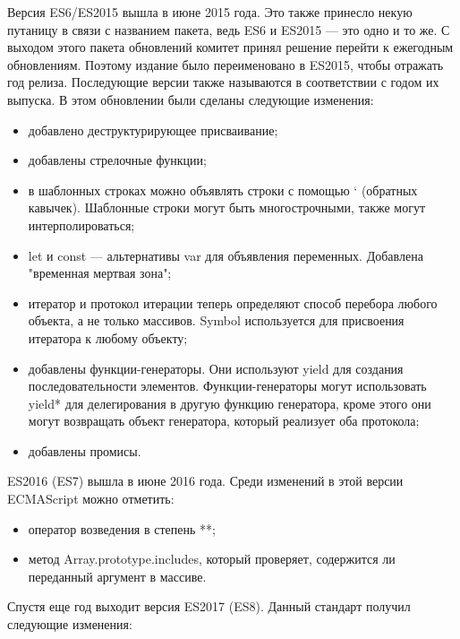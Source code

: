 Версия ES6/ES2015 вышла в июне 2015 года. Это также принесло некую путаницу в связи с названием пакета, ведь ES6 и ES2015 — это одно и то же. С выходом этого пакета обновлений комитет принял решение перейти к ежегодным обновлениям. Поэтому издание было переименовано в ES2015, чтобы отражать год релиза. Последующие версии также называются в соответствии с годом их выпуска. В этом обновлении были сделаны следующие изменения:

\begin{itemize}
    \item добавлено деструктурирующее присваивание;
    \item добавлены стрелочные функции;
    \item в шаблонных строках можно объявлять строки с помощью ` (обратных кавычек). Шаблонные строки могут быть многострочными, также могут интерполироваться;
    \item let и const — альтернативы var для объявления переменных. Добавлена "временная мертвая зона";
    \item итератор и протокол итерации теперь определяют способ перебора любого объекта, а не только массивов. Symbol используется для присвоения итератора к любому объекту;
    \item добавлены функции-генераторы. Они используют yield для создания последовательности элементов. Функции-генераторы могут использовать yield* для делегирования в другую функцию генератора, кроме этого они могут возвращать объект генератора, который реализует оба протокола;
    \item добавлены промисы.
\end{itemize}

ES2016 (ES7) вышла в июне 2016 года. Среди изменений в этой версии ECMAScript можно отметить:

\begin{itemize}
    \item оператор возведения в степень **;
    \item метод Array.prototype.includes, который проверяет, содержится ли переданный аргумент в массиве.
\end{itemize}

Спустя еще год выходит версия ES2017 (ES8). Данный стандарт получил следующие изменения:

